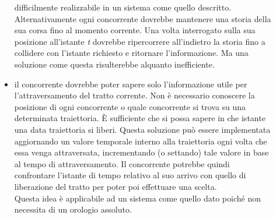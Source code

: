 \begin{description}
\begin{itemize}
difficilmente realizzabile in un sistema come
quello descritto.\\
Alternativamente ogni concorrente dovrebbe mantenere una storia della sua corsa
fino al momento corrente. Una volta interrogato
sulla sua posizione all'istante \emph{t} dovrebbe ripercorrere all'indietro la
storia fino a collidere con l'istante richiesto
e ritornare l'informazione. Ma una soluzione come questa risulterebbe alquanto
inefficiente.
\item il concorrente dovrebbe poter sapere solo l'informazione utile per
l'attraversamento del tratto corrente. Non è necessario
conoscere la posizione di ogni concorrente o quale concorrente si trova su una
determinata traiettoria. \`{E} sufficiente che
si possa sapere in che istante una data traiettoria si liberi. Questa soluzione
può essere implementata aggiornando un valore
temporale interno alla traiettoria ogni volta che essa venga attraversata,
incrementando (o settando) tale valore in base al 
tempo di attraversamento. Il concorrente potrebbe quindi confrontare l'istante
di tempo relativo
al suo arrivo con quello di liberazione del tratto per poter poi effettuare una
scelta.\\
Questa idea è applicabile ad un sistema come quello dato poiché non necessita di
un orologio assoluto.
\end{itemize}
\end{description}

